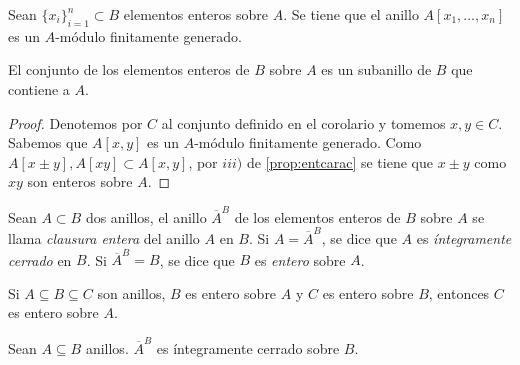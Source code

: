 \documentclass[../main.tex]{subfiles}
\begin{document}
\begin{corollary}
Sean $\{x_i\}_{i=1}^n\subset B$ elementos enteros sobre $A.$ Se tiene que el anillo $A[x_1,\dots,x_n]$ es un $A$-módulo finitamente generado.
\end{corollary}

\begin{corollary}
El conjunto de los elementos enteros de $B$ sobre $A$ es un subanillo de $B$ que contiene a $A.$
\end{corollary}

\begin{proof}
Denotemos por $C$ al conjunto definido en el corolario y tomemos $x,y\in C$. Sabemos que $A[x,y]$ es un $A$-módulo finitamente generado. Como $A[x\pm y],A[xy]\subset A[x,y]$, por $iii)$ de \ref{prop:entcarac} se tiene que $x\pm y$ como $xy$ son enteros sobre $A$.
\end{proof}

\begin{definition}
Sean $A\subset B$ dos anillos, el anillo $\overline{A}^B$ de los elementos enteros de $B$ sobre $A$ se llama \textit{clausura entera} del anillo $A$ en $B$. Si $A=\overline{A}^B$, se dice que  $A$ es \textit{íntegramente cerrado} en $B$. Si $\overline{A}^B = B$, se dice que $B$ es \textit{entero} sobre $A$.
\end{definition}

\begin{corollary} Si $A\subseteq B\subseteq C$ son anillos, $B$ es entero sobre $A$ y $C$ es entero sobre $B$, entonces $C$ es entero sobre $A.$
\end{corollary}

\begin{corollary}
Sean $A\subseteq B$ anillos. $\overline{A}^B$ es íntegramente cerrado sobre $B.$
\end{corollary}
\end{document}
